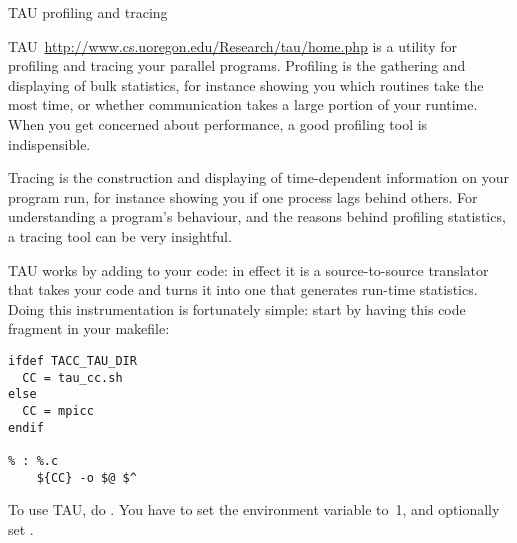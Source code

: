  {TAU profiling and tracing}

TAU~\url{http://www.cs.uoregon.edu/Research/tau/home.php} is a utility
for profiling and tracing your parallel programs. Profiling is the
gathering and displaying of bulk statistics, for instance showing you
which routines take the most time, or whether communication takes a
large portion of your runtime. When you get concerned about
performance, a good profiling tool is indispensible.

Tracing is the construction and displaying of time-dependent
information on  your program run, for instance showing you if one
process lags behind others. For understanding a program's behaviour,
and the reasons behind profiling statistics, a tracing tool can be
very insightful.

TAU works by adding  to your code: in
effect it is a source-to-source translator that takes your code and
turns it into one that generates run-time statistics. Doing this
instrumentation is fortunately simple: start by having this code
fragment in your makefile:
\begin{verbatim}
ifdef TACC_TAU_DIR
  CC = tau_cc.sh
else
  CC = mpicc
endif

% : %.c
	${CC} -o $@ $^
\end{verbatim}

\begin{istc}
To use TAU, do . You have to set the environment
variable  to~1, and optionally set .
\end{istc}
